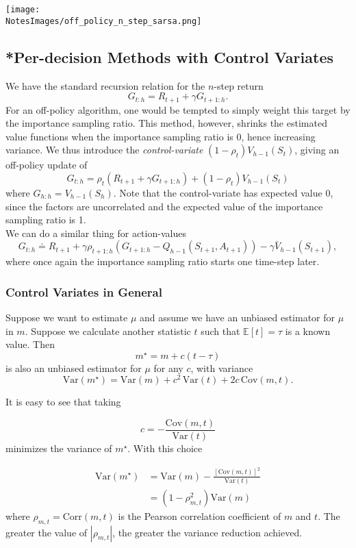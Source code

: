 \texttt{[image: \\NotesImages/off\_policy\_n\_step\_sarsa.png]}

\subsection{*Per-decision Methods with Control Variates}
We have the standard recursion relation for the $n$-step return
\[
    G_{t:h} = R_{t+1} + \gamma G_{t+1:h}.
\]
For an off-policy algorithm, one would be tempted to simply weight this target by the importance sampling ratio. This method, however, shrinks the estimated value functions when the importance sampling ratio is 0, hence increasing variance. We thus introduce the \emph{control-variate} $(1 - \rho_t)V_{h-1}(S_t)$, giving an off-policy update of 
\[
    G_{t:h} = \rho_t (R_{t+1} + \gamma G_{t+1:h}) + (1 - \rho_t)V_{h-1}(S_t)
\]
where $G_{h:h} = V_{h-1}(S_h)$. Note that the control-variate has expected value 0, since the factors are uncorrelated and the expected value of the importance sampling ratio is 1.\\

We can do a similar thing for action-values
\[
    G_{t:h} \doteq R_{t+1} + \gamma \rho_{t+1:h}\left( G_{t+1:h} - Q_{h-1}(S_{t+1}, A_{t+1}) \right) - \gamma \bar{V}_{h-1}(S_{t+1}),
\]
where once again the importance sampling ratio starts one time-step later.

\subsubsection*{Control Variates in General}
Suppose we want to estimate $\mu$ and assume we have an unbiased estimator for $\mu$ in $m$. Suppose we calculate another statistic $t$ such that $\mathbb{E}\left[t\right]=\tau$ is a known value. Then
\[
    m^\star = m + c\left(t-\tau\right)
\]
is also an unbiased estimator for $\mu$ for any $c$, with variance
\[
    \textrm{Var}\left(m^{\star}\right)=\textrm{Var}\left(m\right) + c^2\,\textrm{Var}\left(t\right) + 2c\,\textrm{Cov}\left(m,t\right).
\]

It is easy to see that taking

\[
    c = - \frac{\textrm{Cov}\left(m,t\right)}{\textrm{Var}\left(t\right)}
\]
minimizes the variance of $m^{\star}$. With this choice

\begin{align}
\textrm{Var}(m^{\star}) & =\textrm{Var}(m) - \frac{\left[\textrm{Cov}(m,t)\right]^2}{\textrm{Var}(t)} \\
& = (1-\rho_{m,t}^2)\textrm{Var}(m)
\end{align}
where $\rho_{m,t}=\textrm{Corr}\left(m,t\right) $ is the Pearson correlation coefficient of $m$ and $t$. The greater the value of $|\rho_{m,t}|$, the greater the variance reduction achieved.

